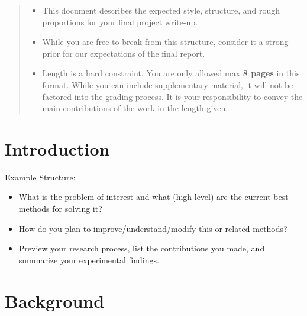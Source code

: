 \documentclass{article}
\begin{document}

\begin{abstract}
  \begin{itemize}
  \item This document describes the expected style, structure, and rough proportions for your final project write-up.
  \item While you are free to break from this structure, consider it a strong prior for our expectations of the final report.
\item Length is a hard constraint. You are only allowed max \textbf{8 pages} in this format. While you can include supplementary material, it will not be factored into the grading process. It is your responsibility to convey the main contributions of the work in the length given.
  \end{itemize}



\end{abstract}

\section{Introduction}
\label{sec:introduction}

Example Structure:
\begin{itemize}
\item What is the problem of interest and what (high-level) are the current best methods for solving it?
\item How do you plan to improve/understand/modify this or related methods?
\item Preview your research process, list the contributions you made, and summarize your experimental findings.
\end{itemize}


\section{Background}
\end{document}
